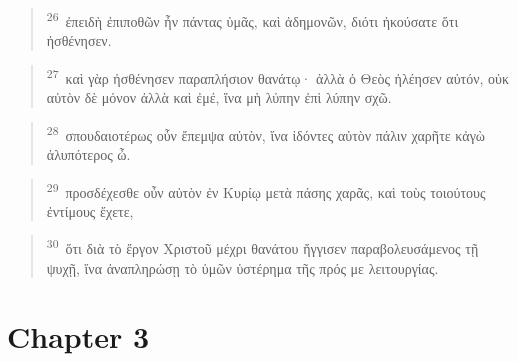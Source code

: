 \documentclass{article}
\newcommand{\currentverse}{1} %
\newcommand{\setcurrentverse}[1]{\renewcommand{\currentverse}{#1}}
\begin{document}
\begin{verse}

\setcurrentverse{26}

\setcounter{footnote}{0}

\textsuperscript{26}~ἐπειδὴ ἐπιποθῶν ἦν πάντας ὑμᾶς, καὶ ἀδημονῶν, διότι ἠκούσατε ὅτι ἠσθένησεν.

\end{verse}

\begin{verse}

\setcurrentverse{27}

\setcounter{footnote}{0}

\textsuperscript{27}~καὶ γὰρ ἠσθένησεν παραπλήσιον θανάτῳ· ἀλλὰ ὁ Θεὸς ἠλέησεν αὐτόν, οὐκ αὐτὸν δὲ μόνον ἀλλὰ καὶ ἐμέ, ἵνα μὴ λύπην ἐπὶ λύπην σχῶ.

\end{verse}

\begin{verse}

\setcurrentverse{28}

\setcounter{footnote}{0}

\textsuperscript{28}~σπουδαιοτέρως οὖν ἔπεμψα αὐτὸν, ἵνα ἰδόντες αὐτὸν πάλιν χαρῆτε κἀγὼ ἀλυπότερος ὦ.

\end{verse}

\begin{verse}

\setcurrentverse{29}

\setcounter{footnote}{0}

\textsuperscript{29}~προσδέχεσθε οὖν αὐτὸν ἐν Κυρίῳ μετὰ πάσης χαρᾶς, καὶ τοὺς τοιούτους ἐντίμους ἔχετε,

\end{verse}

\begin{verse}

\setcurrentverse{30}

\setcounter{footnote}{0}

\textsuperscript{30}~ὅτι διὰ τὸ ἔργον Χριστοῦ μέχρι θανάτου ἤγγισεν παραβολευσάμενος τῇ ψυχῇ, ἵνα ἀναπληρώσῃ τὸ ὑμῶν ὑστέρημα τῆς πρός με λειτουργίας.

\end{verse}

\section*{Chapter 3}
\end{document}
